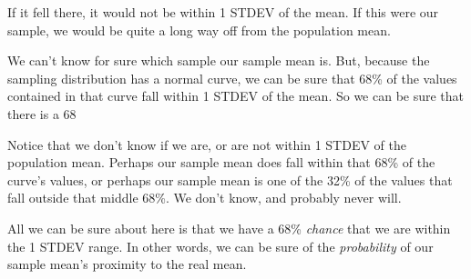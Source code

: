\documentclass[../../../main.tex]{subfiles}
\begin{document}
\begin{center}
\end{center}

If it fell there, it would not be within 1 STDEV of the mean. If this were our sample, we would be quite a long way off from the population mean. 

We can't know for sure which sample our sample mean is. But, because the sampling distribution has a normal curve, we can be sure that 68\% of the values contained in that curve fall within 1 STDEV of the mean. So we can be sure that there is a 68%

Notice that we don't know if we are, or are not within 1 STDEV of the population mean. Perhaps our sample mean does fall within that 68\% of the curve's values, or perhaps our sample mean is one of the 32\% of the values that fall outside that middle 68\%. We don't know, and probably never will. 

All we can be sure about here is that we have a 68\% \emph{chance} that we are within the 1 STDEV range. In other words, we can be sure of the \emph{probability} of our sample mean's proximity to the real mean.
\end{document}
